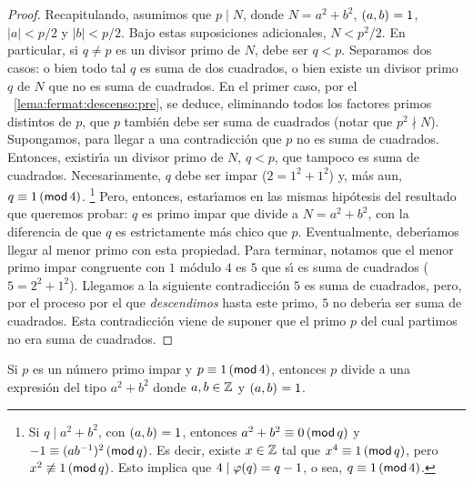 \begin{proof}
	Recapitulando, asumimos que $p\mid N$, donde $N=a^2+b^2$,
	$\mcd{a,b}=1$, $|a|<p/2$ y $|b|<p/2$. Bajo estas suposiciones
	adicionales, $N<p^2/2$. En particular, si $q\neq p$ es un divisor
	primo de $N$, debe ser $q<p$. Separamos dos casos: o bien todo tal
	$q$ es suma de dos cuadrados, o bien existe un divisor primo $q$ de
	$N$ que no es suma de cuadrados.
	En el primer caso, por el \lemaname~\ref{lema:fermat:descenso:pre},
	se deduce, eliminando todos los factores primos distintos de $p$,
	que $p$ tambi\'en debe ser suma de cuadrados (notar que $p^2\nmid N$).
	Supongamos, para llegar a una contradicci\'on que $p$ no es suma de
	cuadrados. Entonces, existir\'{\i}a un divisor primo de $N$, $q<p$,
	que tampoco es suma de cuadrados. Necesariamente, $q$ debe ser impar
	($2=1^2+1^2$) y, m\'as aun, $q\equiv 1\tmodulo[4]$.%
	\footnote{
		Si $q\mid a^2+b^2$, con $\mcd{a,b}=1$, entonces
		$a^2+b^2\equiv 0\tmodulo[q]$ y
		$-1\equiv (ab^{-1})^2\tmodulo[q]$.
		Es decir, existe $x\in\Enteros$ tal que
		$x^4\equiv 1\tmodulo[q]$, pero $x^2\not\equiv 1\tmodulo[q]$.
		Esto implica que $4\mid\eulerphi(q)=q-1$, o sea,
		$q\equiv 1\tmodulo[4]$.
	}
	Pero, entonces, estar\'{\i}amos en las
	mismas hip\'otesis del resultado que queremos probar: $q$ es primo
	impar que divide a $N=a^2+b^2$, con la diferencia de que $q$ es
	estrictamente m\'as chico que $p$. Eventualmente, deber\'{\i}amos
	llegar al menor primo con esta propiedad. Para terminar, notamos que
	el menor primo impar congruente con $1$ m\'odulo $4$ es $5$ que
	s\'{\i} es suma de cuadrados ($5=2^2+1^2$). Llegamos a la siguiente
	contradicci\'on $5$ es suma de cuadrados, pero, por el proceso por
	el que \emph{descendimos} hasta este primo, $5$ no deber\'{\i}a ser
	suma de cuadrados. Esta contradicci\'on viene de suponer que el primo
	$p$ del cual partimos no era suma de cuadrados.
\end{proof}

\begin{lemaFermat}[Reciprocidad]\label{lema:fermat:reciprocidad}
	Si $p$ es un n\'umero primo impar y $p\equiv 1\tmodulo[4]$,
	entonces $p$ divide a una expresi\'on del tipo $a^2+b^2$ donde
	$a,b\in\Enteros$ y $\mcd{a,b}=1$.
\end{lemaFermat}

